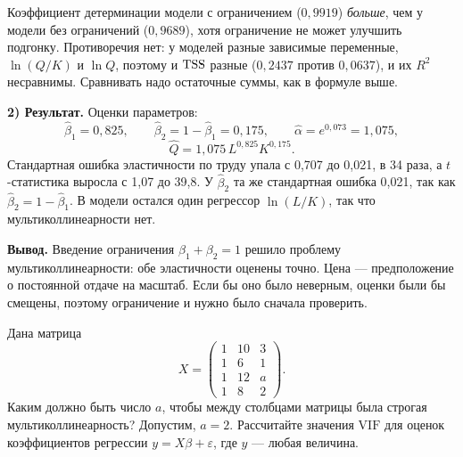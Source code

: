 \begin{solution}
\begin{remark}
Коэффициент детерминации модели с ограничением ($0{,}9919$) \emph{больше}, чем
у модели без ограничений ($0{,}9689$), хотя ограничение не может улучшить
подгонку. Противоречия нет: у моделей разные зависимые переменные, $\ln(Q/K)$
и $\ln Q$, поэтому и $\mathrm{TSS}$ разные ($0{,}2437$ против $0{,}0637$), и их $R^2$
несравнимы. Сравнивать надо остаточные суммы, как в формуле выше.
\end{remark}

\medskip
\textbf{2) Результат.} Оценки параметров:
\[
  \widehat{\beta}_1 = 0{,}825,
  \qquad
  \widehat{\beta}_2 = 1 - \widehat{\beta}_1 = 0{,}175,
  \qquad
  \widehat{\alpha} = e^{0{,}073} = 1{,}075,
\]
\[
  \widehat{Q} = 1{,}075\,L^{0{,}825}K^{0{,}175}.
\]
Стандартная ошибка эластичности по труду упала с 0,707 до 0,021, в 34 раза, а
$t$-статистика выросла с 1,07 до 39,8. У $\widehat{\beta}_2$ та же стандартная
ошибка 0,021, так как $\widehat{\beta}_2 = 1 - \widehat{\beta}_1$. В модели
остался один регрессор $\ln(L/K)$, так что мультиколлинеарности нет.

\medskip
\textbf{Вывод.} Введение ограничения $\beta_1 + \beta_2 = 1$ решило проблему
мультиколлинеарности: обе эластичности оценены точно. Цена — предположение о
постоянной отдаче на масштаб. Если бы оно было неверным, оценки были бы
смещены, поэтому ограничение и нужно было сначала проверить.
\end{solution}

\ifsolutions\clearpage\fi
{}

Дана матрица
\[
  X = \begin{pmatrix}
        1 & 10 & 3 \\
        1 &  6 & 1 \\
        1 & 12 & a \\
        1 &  8 & 2
      \end{pmatrix}.
\]
Каким должно быть число $a$, чтобы между столбцами матрицы была строгая
мультиколлинеарность? Допустим, $a = 2$. Рассчитайте значения $\mathrm{VIF}$
для оценок коэффициентов регрессии $y = X\beta + \varepsilon$, где $y$ —
любая величина.

